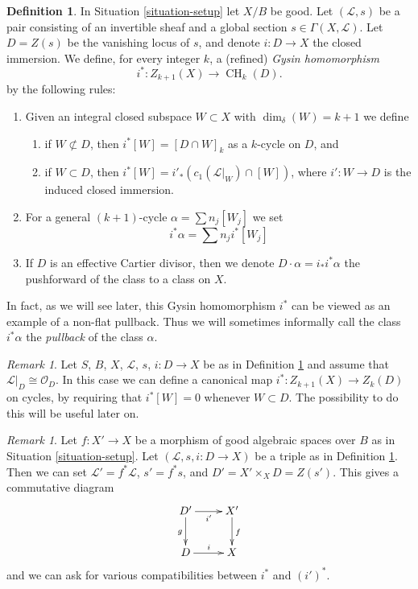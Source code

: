 \documentclass{stacks-project}
\theoremstyle{plain}
\theoremstyle{definition}
\newtheorem{definition}[subsection]{Definition}
\theoremstyle{remark}
\newtheorem{remark}[subsection]{Remark}
\numberwithin{equation}{subsection}
\def\CH{\mathop{\mathrm{CH}}\nolimits}
\begin{document}
\begin{definition}
\label{definition-gysin-homomorphism}
In Situation \ref{situation-setup} let $X/B$ be good.
Let $(\mathcal{L}, s)$ be a pair consisting of an invertible
sheaf and a global section $s \in \Gamma(X, \mathcal{L})$.
Let $D = Z(s)$ be the vanishing locus of $s$, and
denote $i : D \to X$ the closed immersion.
We define, for every integer $k$, a (refined) {\it Gysin homomorphism}
$$
i^* : Z_{k + 1}(X) \to \CH_k(D).
$$
by the following rules:
\begin{enumerate}
\item Given an integral closed subspace $W \subset X$ with
$\dim_\delta(W) = k + 1$ we define
\begin{enumerate}
\item if $W \not \subset D$, then $i^*[W] = [D \cap W]_k$ as a
$k$-cycle on $D$, and
\item if $W \subset D$, then
$i^*[W] = i'_*(c_1(\mathcal{L}|_W) \cap [W])$,
where $i' : W \to D$ is the induced closed immersion.
\end{enumerate}
\item For a general $(k + 1)$-cycle $\alpha = \sum n_j[W_j]$
we set
$$
i^*\alpha = \sum n_j i^*[W_j]
$$
\item If $D$ is an effective Cartier divisor, then we denote
$D \cdot \alpha = i_*i^*\alpha$ the pushforward of
the class to a class on $X$.
\end{enumerate}
\end{definition}

\noindent
In fact, as we will see later, this Gysin homomorphism $i^*$ can be viewed
as an example of a non-flat pullback. Thus we will sometimes informally
call the class $i^*\alpha$ the {\it pullback} of the class $\alpha$.

\begin{remark}
\label{remark-on-cycles}
Let $S$, $B$, $X$, $\mathcal{L}$, $s$, $i : D \to X$ be as in
Definition \ref{definition-gysin-homomorphism} and assume
that $\mathcal{L}|_D \cong \mathcal{O}_D$. In this case we
can define a canonical map $i^* : Z_{k + 1}(X) \to Z_k(D)$
on cycles, by requiring that $i^*[W] = 0$ whenever $W \subset D$.
The possibility to do this will be useful later on.
\end{remark}

\begin{remark}
\label{remark-pullback-pairs}
Let $f : X' \to X$ be a morphism of good algebraic spaces over $B$
as in Situation \ref{situation-setup}. Let $(\mathcal{L}, s, i : D \to X)$
be a triple as in Definition \ref{definition-gysin-homomorphism}.
Then we can set $\mathcal{L}' = f^*\mathcal{L}$, $s' = f^*s$, and
$D' = X' \times_X D = Z(s')$. This gives a commutative diagram
$$
\xymatrix{
D' \ar[d]_g \ar[r]_{i'} & X' \ar[d]^f \\
D \ar[r]^i & X
}
$$
and we can ask for various compatibilities between $i^*$ and $(i')^*$.
\end{remark}
\end{document}
